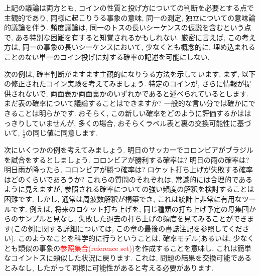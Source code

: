 \documentclass[10pt,dvipdfmx,a4]{beamer}
\newcommand{\tcr}[1]{\textcolor{red}{#1}}
\begin{document}

\begin{frame}
上記の議論は両方とも, コインの性質と投げ方についての判断を必要とする点で主観的であり, 同様に起こりうる事象の意味, 同一の測定, 独立についての意味論的議論を伴う.
頻度議論は, 同一のトスの長いシーケンスの仮説を含むという点で, ある特別な困難を有すると知覚されるかもしれない.
厳密に言えば, この考え方は, 同一の事象の長いシーケンスにおいて, 少なくとも概念的に, 埋め込まれることのない単一のコイン投げに対する確率の記述を可能にしない.

次の例は, 確率判断がますます主観的になりうる方法を示しています.
まず, 以下の修正されたコイン実験を考えてみましょう.
特定のコインが, さらに情報が提供されないで, 両面表か両面裏かのいずれかであると述べられているとします.
まだ表の確率について議論することはできますか?
一般的な言い分では確かにできることは明らかです.
おそらく, この新しい確率をどのように評価するかははっきりしていませんが, 多くの場合, おそらくラベル表と裏の交換可能性に基づいて, $\tfrac{1}{2}$の同じ値に同意します.
\end{frame}


\begin{frame}
次にいくつかの例を考えてみましょう.
明日のサッカーでコロンビアがブラジルを試合をするとしましょう.
コロンビアが勝利する確率は?
明日の雨の確率は?
明日雨が降ったら, コロンビアが勝つ確率は?
ロケット打ち上げが失敗する確率はどのくらいであろうか?
これらの質問のそれぞれは, 常識的には合理的であるように見えますが, 参照される確率についての強い頻度の解釈を検討することは困難です.
しかし, 通常は周波数解釈が構築でき, これは統計上非常に有用なツールです.
例えば, 将来のロケット打ち上げを, 同じ種類の打ち上げ予定の母集団からのサンプルと見なし, 失敗した過去の打ち上げの頻度を見てみることができます(この例に関する詳細については, この章の最後の書誌注記を参照してください).
このようなことを科学的に行うということは, 確率モデル(あるいは, 少なくとも類似の事象の\tcr{参照集合(reference set)})を作成することを意味し, これは簡単なコイントスに類似した状況に戻ります.
これは, 問題の結果を交換可能であるとみなし, したがって同様に可能性があると考える必要があります.
\end{frame}

\end{document}
